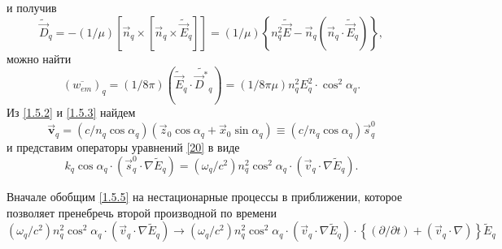 \documentclass[a4paper]{article}
\begin{document}
и получив $$\tilde{\vec{D}}_{q}=-\left(1/\mu\right)\left[\vec{n}_{q}\times\left[\vec{n}_{q}\times\tilde{\vec{E}}_{q}\right]\right]=\left(1/\mu\right)\left\{n^{2}_{q}\tilde{\vec{E}}-\vec{n}_{q}\left(\vec{n}_{q}\cdot\tilde{\vec{E}}_{q}\right)\right\},$$
можно найти
\begin{equation}
	\left(\overline{w_{em}}\right)_{q}=\left(1/8\pi\right)\left(\tilde{\vec{E}}_{q}\cdot\tilde{\vec{D}^{*}}_{q}\right)=\left(1/8\pi\mu\right)n^{2}_{q}E_{q}^{2}\cdot\cos^{2}\alpha_{q}.
	\label{1.5.3}
\end{equation}
Из \eqref{1.5.2} и \eqref{1.5.3} найдем 
\begin{equation}
	\vec{\textbf{v}}_{q}=\left(c/n_{q}\cos\alpha_{q}\right)\left(\vec{z}_{0}\cos\alpha_{q}+\vec{x}_{0}\sin\alpha_{q}\right)\equiv\left(c/n_{q}\cos\alpha_{q}\right)\vec{s}_{q}^{0}
	\label{1.5.4}
\end{equation}
и представим операторы уравнений \eqref{20} в виде 
\begin{equation}
	k_{q}\cos\alpha_{q}\cdot\left(\vec{s}_{q}^{0}\cdot\nabla\tilde{E}_{q}\right)=\left(\omega_{q}/c^{2}\right)n_{q}^{2}\cos^{2}\alpha_{q}\cdot\left(\vec{v}_{q}\cdot\nabla\tilde{E}_{q}\right).
	\label{1.5.5}
\end{equation}

Вначале обобщим \eqref{1.5.5} на нестационарные процессы в приближении, которое позволяет пренебречь второй производной по времени 
\begin{equation}
	\left(\omega_{q}/c^{2}\right)n_{q}^{2}\cos^{2}\alpha_{q}\cdot\left(\vec{v}_{q}\cdot\nabla\tilde{E}_{q}\right)\rightarrow\left(\omega_{q}/c^{2}\right)n_{q}^{2}\cos^{2}\alpha_{q}\cdot\left(\vec{v}_{q}\cdot\nabla\tilde{E}_{q}\right)\cdot\left\{\left(\partial/\partial t\right)+\left(\vec{v}_{q}\cdot\nabla\right)\right\}\tilde{E}_{q}
	\label{1.5.6}
\end{equation} 
\end{document}
